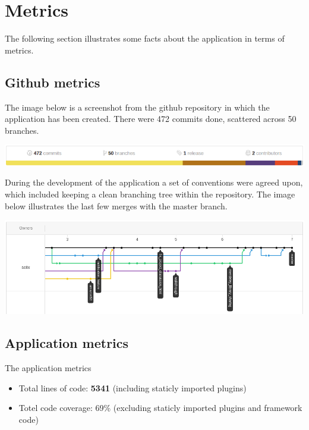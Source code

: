 \section{Metrics}

The following section illustrates some facts about the application in terms of metrics. 

\subsection{Github metrics}

The image below is a screenshot from the github repository in which the application has been created.
There were 472 commits done, scattered across 50 branches.

\begin{center}
\includegraphics[scale=0.5]{./img/github_stats.png}
\end{center}

During the development of the application a set of conventions were agreed upon, which included keeping a clean
branching tree within the repository. The image below illustrates the last few merges with the master branch.

\begin{center}
\includegraphics[scale=0.5]{./img/github_tree.png}
\end{center}

\subsection{Application metrics}

The application metrics

\begin{itemize}
	\item Total lines of code: \textbf{5341} (including staticly imported plugins)
	\item Totel code coverage: 69\% (excluding staticly imported plugins and framework code)
\end{itemize}